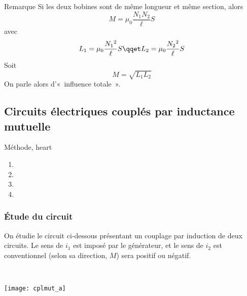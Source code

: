 \documentclass[../main/main.tex]{subfiles}
\begin{document}
\begin{rrema}{Remarque}
  Si les deux bobines sont de même longueur et même section, alors
  \[
    M = \mu_0 \frac{N_1N_2}{\ell }S
  \]
  avec
  \[
    L_1 = \mu_0 \frac{N_1{}^{2}}{\ell }S
    \qqet
    L_2 = \mu_0 \frac{N_2{}^{2}}{\ell }S
  \]
  Soit
  \[
    \boxed{M = \sqrt{L_1L_2}}
  \]
  On parle alors d'«~influence totale~».
\end{rrema}

\subsection{Circuits électriques couplés par inductance mutuelle}
\label{ssec:inducmutcpl}

\begin{tprop}{Méthode, heart}
  \begin{enumerate}
    \item {}
    \item {}
    \item {}
    \item {}
  \end{enumerate}
\end{tprop}

\subsubsection{Étude du circuit}
\label{ssec:mutcpletude}
\noindent
\begin{minipage}[t]{.49\linewidth}
  On étudie le circuit ci-dessous présentant un couplage par induction de deux
circuits. Le sens de $i_1$ est imposé par le générateur, et le sens de $i_2$ est
conventionnel (selon sa direction, $M$) sera positif ou négatif.
\end{minipage}
\hfill
\begin{minipage}[t]{.49\linewidth}
  ~
  \vspace*{-40pt}
  \begin{center}
    \texttt{[image: cplmut\_a]}
    \label{fig:cplmut_a}
  \end{center}
\end{minipage}
\smallbreak
\end{document}
